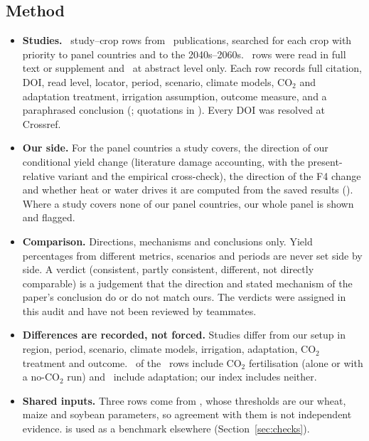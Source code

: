 \subsection{Method}
\begin{itemize}
\item \textbf{Studies.} \litNRows\ study--crop rows from \litNStudies\ publications, searched for each crop with
priority to panel countries and to the 2040s--2060s. \litNFull\ rows were read in full text or supplement and
\litNAbstract\ at abstract level only. Each row records full citation, DOI, read level, locator, period, scenario,
climate models, CO$_2$ and adaptation treatment, irrigation assumption, outcome measure, and a paraphrased conclusion
(; quotations in ). Every DOI was
resolved at Crossref.
\item \textbf{Our side.} For the panel countries a study covers, the direction of our conditional yield change
(literature damage accounting, with the present-relative variant and the empirical cross-check), the direction of the
F4 change and whether heat or water drives it are computed from the saved results
(). Where a study covers none of our panel countries, our whole panel is shown and
flagged.
\item \textbf{Comparison.} Directions, mechanisms and conclusions only. Yield percentages from different metrics,
scenarios and periods are never set side by side. A verdict (consistent, partly consistent, different, not directly
comparable) is a judgement that the direction and stated mechanism of the paper's conclusion do or do not match ours.
The verdicts were assigned in this audit and have not been reviewed by teammates.
\item \textbf{Differences are recorded, not forced.} Studies differ from our setup in region, period, scenario,
climate models, irrigation, adaptation, CO$_2$ treatment and outcome. \litNCoTwoIncl\ of the \litNRows\ rows include
CO$_2$ fertilisation (alone or with a no-CO$_2$ run) and \litNAdaptIncl\ include adaptation; our index includes
neither.
\item \textbf{Shared inputs.} Three rows come from \citet{deryng2014}, whose thresholds are our wheat, maize and soybean
parameters, so agreement with them is not independent evidence. \citet{zhao2017} is used as a benchmark elsewhere
(Section~\ref{sec:checks}).
\end{itemize}

